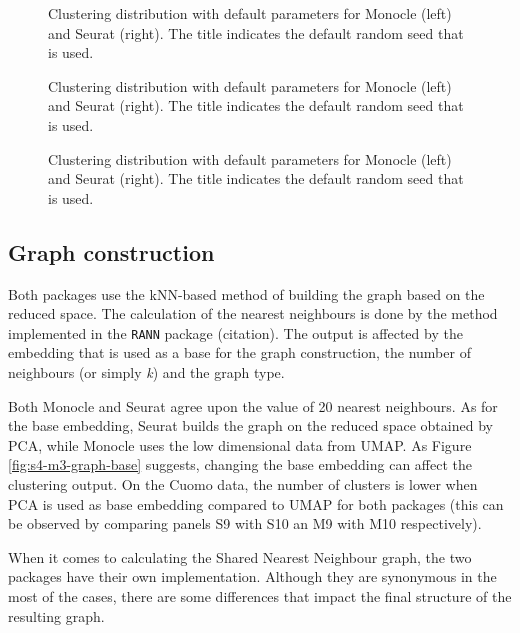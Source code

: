 \begin{figure}[H]
    \centering
    \caption{\label{fig:s4-m3-pca}Clustering distribution with default parameters for Monocle (left) and Seurat (right). The title indicates the default random seed that is used.}
\end{figure}


\begin{figure}[H]
    \centering
    \caption{\label{fig:s4-m3-min-dist}Clustering distribution with default parameters for Monocle (left) and Seurat (right). The title indicates the default random seed that is used.}
\end{figure}

\begin{figure}[H]
    \centering
    \caption{\label{fig:s4-m3-n-neigh-umap}Clustering distribution with default parameters for Monocle (left) and Seurat (right). The title indicates the default random seed that is used.}
\end{figure}

\subsection{Graph construction}
Both packages use the kNN-based method of building the graph based on the reduced space. The calculation of the nearest neighbours is done by the method implemented in the \verb|RANN| package (citation). The output is affected by the embedding that is used as a base for the graph construction, the number of neighbours (or simply \textit{k}) and the graph type.

Both Monocle and Seurat agree upon the value of 20 nearest neighbours. As for the base embedding, Seurat builds the graph on the reduced space obtained by PCA, while Monocle uses the low dimensional data from UMAP. As Figure \ref{fig:s4-m3-graph-base} suggests, changing the base embedding can affect the clustering output. On the Cuomo data, the number of clusters is lower when PCA is used as base embedding compared to UMAP for both packages (this can be observed by comparing panels S9 with S10 an M9 with M10 respectively).

When it comes to calculating the Shared Nearest Neighbour graph, the two packages have their own implementation. Although they are synonymous in the most of the cases, there are some differences that impact the final structure of the resulting graph.

